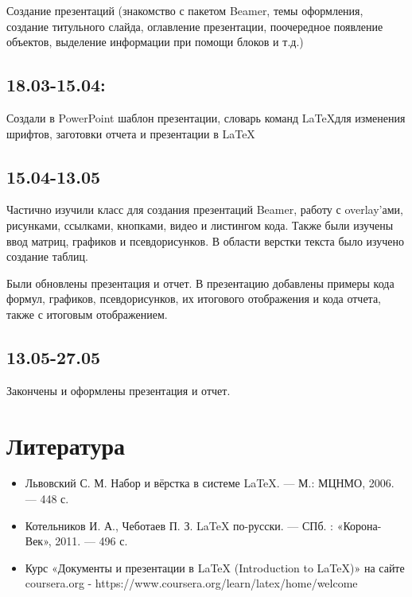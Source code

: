\documentclass{article}
\begin{document}
	Создание презентаций (знакомство с пакетом Beamer, темы оформления, создание титульного слайда, оглавление презентации, поочередное появление объектов, выделение информации при помощи блоков и т.д.)
	
	\subsection*{18.03-15.04:}
	
	Создали в PowerPoint шаблон презентации, словарь команд \LaTeX для изменения шрифтов, заготовки отчета и презентации в \LaTeX
	
	\subsection*{15.04-13.05}
	
	Частично изучили класс для создания презентаций Beamer, работу с overlay’ами, рисунками, ссылками, кнопками, видео и листингом кода. Также были изучены ввод матриц, графиков и псевдорисунков. В области верстки текста было изучено создание таблиц.
	
	Были обновлены презентация и отчет. В презентацию добавлены примеры кода формул, графиков, псевдорисунков, их итогового отображения и кода отчета, также с итоговым отображением.
	
	\subsection*{13.05-27.05}
	
	Закончены и оформлены презентация и отчет. 
	
	\section{Литература}
	
	\begin{itemize}
		\item Львовский С. М. Набор и вёрстка в системе LaTeX. — М.: МЦНМО,
		 2006. — 448 с.
		 \item Котельников И. А., Чеботаев П. З. LaTeX по-русски. — СПб. : «Корона-Век», 2011. — 496 с.
		 \item Курс «Документы и презентации в LaTeX (Introduction to LaTeX)» на сайте coursera.org - https://www.coursera.org/learn/latex/home/welcome
	\end{itemize}
\end{document}
